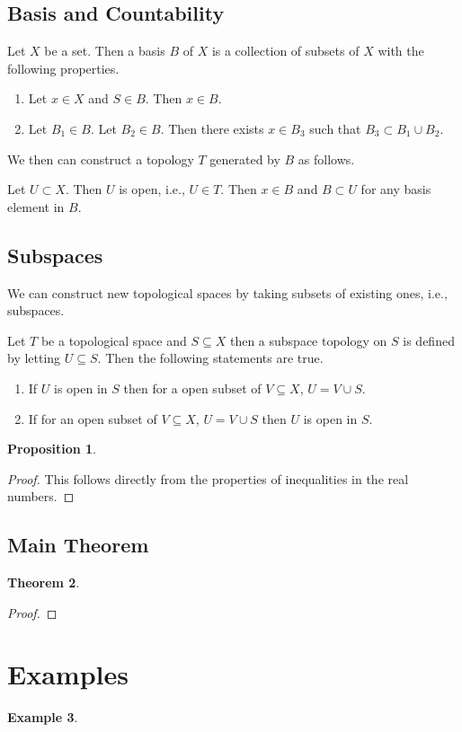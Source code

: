 \documentclass{article}
\newtheorem{theorem}{Theorem}[section]
\newtheorem{proposition}[theorem]{Proposition}
\newtheorem{example}[theorem]{Example}
\begin{document}
\subsection{Basis and Countability}

Let $ X $ be a set. Then a basis $ B $ of $ X $ is a collection of subsets of $ X $ with the following
properties.

\begin{enumerate}
\item Let $ x \in X $ and $ S \in B $. Then $ x \in B $.
\item Let $ B_{1} \in B $. Let $ B_{2} \in B $. Then there exists  $ x \in B_{3} $ such that $ B_{3} \subset B_{1} \cup B_{2} $.
\end{enumerate}

We then can construct a topology $ T $ generated by $ B $ as follows.

Let $ U \subset X $. Then $ U $ is open, i.e., $ U \in T $. Then  $ x \in B $ and $ B \subset U $ for any basis element in $ B $.

\subsection{Subspaces}

We can construct new topological spaces by taking subsets of existing ones, i.e., subspaces.

Let $ T $ be a topological space and $ S \subseteq X $ then a subspace topology on $ S $ is defined
by letting  $ U \subseteq  S $. Then the following statements are true.

\begin{enumerate}
\item If $ U $ is open in $ S $ then for a open subset of $ V \subseteq X $, $ U =  V \cup  S $.
\item If for an open subset of $ V \subseteq X $, $ U =  V \cup  S $ then  $ U $ is open in $ S $.
\end{enumerate}

\begin{proposition}
\end{proposition}

\begin{proof}
This follows directly from the properties of inequalities in the real numbers.
\end{proof}

\subsection{Main Theorem}

\begin{theorem}

\end{theorem}

\begin{proof}

\end{proof}

\section{Examples}

\begin{example}

\end{example}
\end{document}
